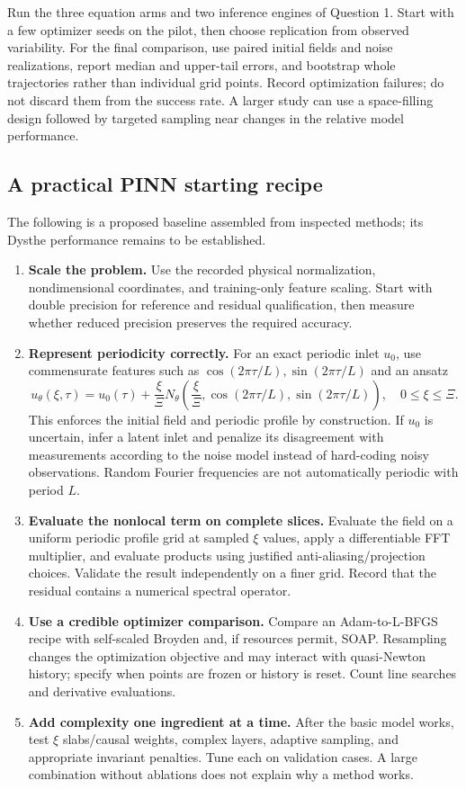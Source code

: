 Run the three equation arms and two inference engines of Question 1.
Start with a few optimizer seeds on the pilot, then choose replication
from observed variability. For the final comparison, use paired initial
fields and noise realizations, report median and upper-tail errors, and
bootstrap whole trajectories rather than individual grid points.
Record optimization failures; do not discard them from the success rate.
A larger study can use a space-filling design followed by targeted
sampling near changes in the relative model performance.

\subsection{A practical PINN starting recipe}
The following is a proposed baseline assembled from inspected methods;
its Dysthe performance remains to be established.
\begin{enumerate}
\item \textbf{Scale the problem.}
Use the recorded physical normalization, nondimensional coordinates,
and training-only feature scaling. Start with double precision for
reference and residual qualification, then measure whether reduced
precision preserves the required accuracy.
\item \textbf{Represent periodicity correctly.}
For an exact periodic inlet $u_0$, use commensurate features such as
$\cos(2\pi\tau/L),\sin(2\pi\tau/L)$ and an ansatz
\[
 u_\theta(\xi,\tau)=u_0(\tau)
       +\frac{\xi}{\Xi}N_\theta\!\left(
          \frac{\xi}{\Xi},\cos(2\pi\tau/L),\sin(2\pi\tau/L)\right),
 \quad 0\leq\xi\leq\Xi .
\]
This enforces the initial field and periodic profile by construction.
If $u_0$ is uncertain, infer a latent inlet and penalize its disagreement
with measurements according to the noise model instead of hard-coding
noisy observations. Random Fourier frequencies are not automatically
periodic with period $L$.
\item \textbf{Evaluate the nonlocal term on complete slices.}
Evaluate the field on a uniform periodic profile grid at sampled
$\xi$ values, apply a differentiable FFT multiplier, and evaluate
products using justified anti-aliasing/projection choices. Validate the
result independently on a finer grid. Record that the residual contains
a numerical spectral operator.
\item \textbf{Use a credible optimizer comparison.}
Compare an Adam-to-L-BFGS recipe with self-scaled Broyden and, if resources
permit, SOAP. Resampling changes the optimization objective and may
interact with quasi-Newton history; specify when points are frozen or
history is reset. Count line searches and derivative evaluations.
\item \textbf{Add complexity one ingredient at a time.}
After the basic model works, test $\xi$ slabs/causal weights, complex
layers, adaptive sampling, and appropriate invariant penalties. Tune
each on validation cases. A large combination without ablations does
not explain why a method works.
\end{enumerate}

